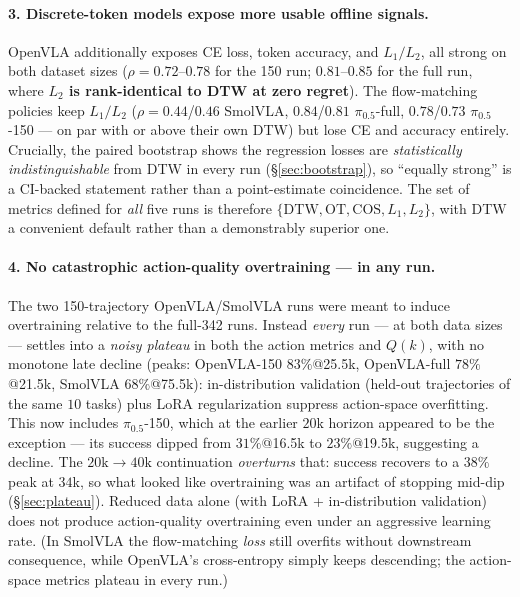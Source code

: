 \documentclass[11pt]{article}
\begin{document}
\paragraph{3. Discrete-token models expose more usable offline signals.}
OpenVLA additionally exposes CE loss, token accuracy, and $L_1/L_2$, all strong on both dataset sizes
($\rho{=}0.72$--$0.78$ for the 150 run; $0.81$--$0.85$ for the full run, where \textbf{$L_2$ is
rank-identical to DTW at zero regret}). The flow-matching policies keep $L_1/L_2$ ($\rho{=}0.44$/$0.46$
SmolVLA, $0.84$/$0.81$ $\pi_{0.5}$-full, $0.78$/$0.73$ $\pi_{0.5}$-150 --- on par with or above their own DTW) but
lose CE and accuracy entirely. Crucially, the paired bootstrap shows the regression losses are
\emph{statistically indistinguishable} from DTW in every run (\S\ref{sec:bootstrap}), so ``equally
strong'' is a CI-backed statement rather than a point-estimate coincidence. The set of metrics defined
for \emph{all} five runs is therefore $\{\text{DTW}, \text{OT}, \text{COS}, L_1, L_2\}$, with DTW a
convenient default rather than a demonstrably superior one.

\paragraph{4. No catastrophic action-quality overtraining --- in any run.}
The two 150-trajectory OpenVLA/SmolVLA runs were meant to induce overtraining relative to the full-342
runs. Instead \emph{every} run --- at both data sizes --- settles into a \emph{noisy plateau} in both the
action metrics and $Q(k)$, with no monotone late decline (peaks: OpenVLA-150 $83\%$@25.5k, OpenVLA-full
$78\%$@21.5k, SmolVLA $68\%$@75.5k): in-distribution validation (held-out trajectories of the same $10$
tasks) plus LoRA regularization suppress action-space overfitting. This now includes $\pi_{0.5}$-150,
which at the earlier $20$k horizon appeared to be the exception --- its success dipped from $31\%$@16.5k
to $23\%$@19.5k, suggesting a decline. The $20\text{k}\!\to\!40\text{k}$ continuation \emph{overturns}
that: success recovers to a $38\%$ peak at $34$k, so what looked like overtraining was an artifact of
stopping mid-dip (\S\ref{sec:plateau}). Reduced data alone (with LoRA + in-distribution validation) does
not produce action-quality overtraining even under an aggressive learning rate. (In SmolVLA the
flow-matching \emph{loss} still overfits without downstream consequence, while OpenVLA's cross-entropy
simply keeps descending; the action-space metrics plateau in every run.)
\end{document}
